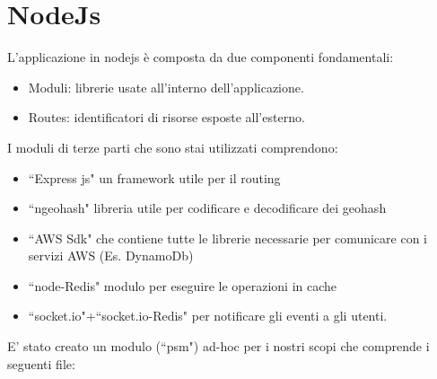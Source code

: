 \section{NodeJs}
L'applicazione in nodejs è composta da due componenti fondamentali:
\begin{itemize}
	\item Moduli: librerie usate all'interno dell'applicazione.
	\item Routes: identificatori di risorse esposte all'esterno.
\end{itemize}
I moduli di terze parti che sono stai utilizzati comprendono:
\begin{itemize}
 	\item ``Express js" un framework utile per il routing
	\item ``ngeohash" libreria utile per codificare e decodificare dei geohash
	\item ``AWS Sdk" che contiene tutte le librerie necessarie per comunicare con i servizi AWS (Es. DynamoDb)
	\item ``node-Redis" modulo per eseguire le operazioni in cache 
	\item ``socket.io"+``socket.io-Redis" per notificare gli eventi a gli utenti.
 \end{itemize}
E' stato creato un modulo (``psm") ad-hoc per i nostri scopi che comprende i seguenti file:
